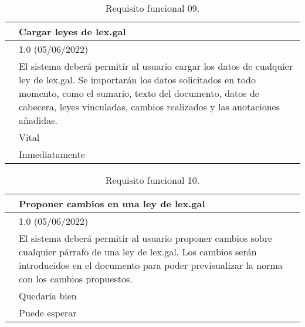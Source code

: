 \begin{table}[H]
\begin{center}
\begin{tabular}{|p{3cm}|p{10cm}|} \hline
\centering {\bf FRQ-09} & Cargar leyes de lex.gal  \\ \hline\hline
\centering {\bf Versión} & 1.0 (05/06/2022) \\ \hline
\centering {\bf Descripción} & El sistema deberá permitir al usuario cargar los datos de cualquier ley de lex.gal. Se importarán los datos solicitados en todo momento, como el sumario, texto del documento, datos de cabecera, leyes vinculadas, cambios realizados y las anotaciones añadidas. \\ \hline
\centering {\bf Importancia} & Vital \\ \hline
\centering {\bf Urgencia} & Inmediatamente \\ \hline
\end{tabular}
\caption{Requisito funcional 09.}
\label{enlaceFRQ9}
\end{center}
\end{table}

\begin{table}[H]
\begin{center}
\begin{tabular}{|p{3cm}|p{10cm}|} \hline
\centering {\bf FRQ-10} & Proponer cambios en una ley de lex.gal  \\ \hline\hline
\centering {\bf Versión} & 1.0 (05/06/2022) \\ \hline
\centering {\bf Descripción} & El sistema deberá permitir al usuario proponer cambios sobre cualquier párrafo de una ley de lex.gal. Los cambios serán introducidos en el documento para poder previsualizar la norma con los cambios propuestos. \\ \hline
\centering {\bf Importancia} & Quedaría bien \\ \hline
\centering {\bf Urgencia} & Puede esperar \\ \hline
\end{tabular}
\caption{Requisito funcional 10.}
\label{enlaceFRQ10}
\end{center}
\end{table}

